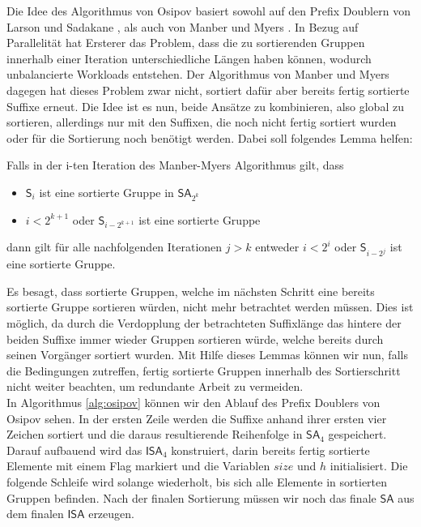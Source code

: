 Die Idee des Algorithmus von Osipov basiert sowohl auf den Prefix Doublern von Larson und Sadakane \cite{saca:1}, als auch von Manber und Myers \cite{Manber1993}. In Bezug auf Parallelität hat Ersterer das Problem, dass die zu sortierenden Gruppen innerhalb einer Iteration unterschiedliche Längen haben können, wodurch unbalancierte Workloads entstehen. Der Algorithmus von Manber und Myers dagegen hat dieses Problem zwar nicht, sortiert dafür aber bereits fertig sortierte Suffixe erneut. Die Idee ist es nun, beide Ansätze zu kombinieren, also global zu sortieren, allerdings nur mit den Suffixen, die noch nicht fertig sortiert wurden oder für die Sortierung noch benötigt werden. Dabei soll folgendes Lemma helfen:
\begin{lemma}\label{lem:sort-gruppe}
Falls in der i-ten Iteration des Manber-Myers Algorithmus gilt, dass
\begin{itemize}
\item $\mathsf{S}_i$ ist eine sortierte Gruppe in $\mathsf{SA}_{2^k}$
\item $i < 2^{k+1}$ oder $\mathsf{S}_{i-2^{k+1}}$ ist eine sortierte Gruppe
\end{itemize} 
dann gilt für alle nachfolgenden Iterationen $j>k$ entweder $i<2^i$ oder $\mathsf{S}_{i-2^j}$ ist eine sortierte Gruppe.
\end{lemma}
Es besagt, dass sortierte Gruppen, welche im nächsten Schritt eine bereits sortierte Gruppe sortieren würden, nicht mehr betrachtet werden müssen. Dies ist möglich, da durch die Verdopplung der betrachteten Suffixlänge das hintere der beiden Suffixe immer wieder Gruppen sortieren würde, welche bereits durch seinen Vorgänger sortiert wurden.
Mit Hilfe dieses Lemmas können wir nun, falls die Bedingungen zutreffen, fertig sortierte Gruppen innerhalb des Sortierschritt nicht weiter beachten, um redundante Arbeit zu vermeiden.\\

In Algorithmus \ref{alg:osipov} können wir den Ablauf des Prefix Doublers von Osipov sehen. In der ersten Zeile werden die Suffixe anhand ihrer ersten vier Zeichen sortiert und die daraus resultierende Reihenfolge in $\mathsf{SA}_4$ gespeichert. Darauf aufbauend wird das $\mathsf{ISA}_4$ konstruiert, darin bereits fertig sortierte Elemente mit einem Flag markiert und die Variablen $size$ und $h$ initialisiert. Die folgende Schleife wird solange wiederholt, bis sich alle Elemente in sortierten Gruppen befinden. Nach der finalen Sortierung müssen wir noch das finale $\mathsf{SA}$ aus dem finalen $\mathsf{ISA}$ erzeugen.

